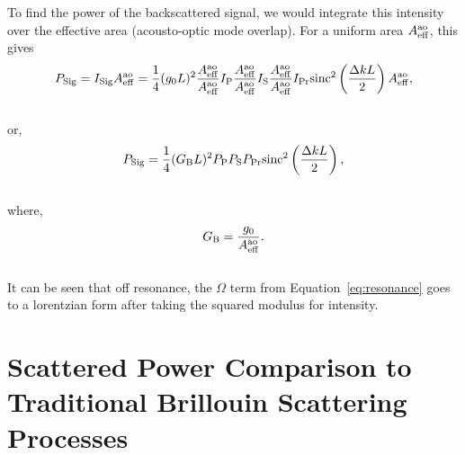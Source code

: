To find the power of the backscattered signal, we would integrate this intensity over the effective area (acousto-optic mode overlap). For a uniform area \(A_{\rm eff}^{\rm ao}\), this gives
\\
\begin{equation}
  P_{\rm Sig} = I_{\rm Sig}A_{\rm eff}^{\rm ao} = \frac{1}{4}(g_{0}L)^{2}\frac{A_{\rm eff}^{\rm ao}}{A_{\rm eff}^{\rm ao}}I_{\rm P}\frac{A_{\rm eff}^{\rm ao}}{A_{\rm eff}^{\rm ao}}I_{\rm S}\frac{A_{\rm eff}^{\rm ao}}{A_{\rm eff}^{\rm ao}}I_{\rm Pr}\mathrm{sinc}^{2}\left(\frac{\Delta kL}{2}\right)A_{\rm eff}^{\rm ao},
\end{equation}
\\
or,
\\
\begin{equation}
  P_{\rm Sig} = \frac{1}{4}(G_{\rm B}L)^{2}P_{\rm P}P_{\rm S}P_{\rm Pr}\mathrm{sinc}^{2}\left(\frac{\Delta kL}{2}\right),
\end{equation}
\\
where,
\\
\begin{equation}
  G_{\rm B} = \frac{g_{0}}{A_{\rm eff}^{\rm ao}}.
\end{equation}
\\
It can be seen that off resonance, the \(\Omega\) term from Equation~\ref{eq:resonance} goes to a lorentzian form after taking the squared modulus for intensity.

\newpage


\section{Scattered Power Comparison to Traditional Brillouin Scattering Processes}
\label{appendix:comparison}

